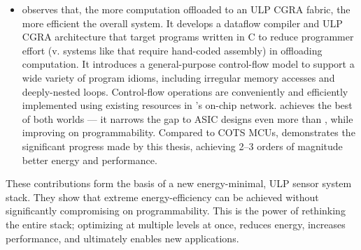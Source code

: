 \begin{itemize}
\item \riptide observes that, the more computation offloaded to an ULP CGRA fabric, the more efficient the overall system.
%
It develops a dataflow compiler and ULP CGRA architecture that target programs written in C to reduce programmer effort (v. systems like \snafu that require hand-coded assembly) in offloading computation.
% 
It introduces a general-purpose control-flow model to support a wide variety of program idioms, including irregular memory accesses and deeply-nested loops.
%
Control-flow operations are conveniently and efficiently implemented using existing resources in \riptide's on-chip network.
% 
% 
% 
\riptide achieves the best of both worlds --- it narrows the gap to ASIC designs even more than \snafu, while improving on programmability.
% 
Compared to COTS MCUs, \riptide demonstrates the significant progress made by this thesis, achieving 2--3 orders of magnitude better energy and performance.

\end{itemize}

These contributions form the basis of a new energy-minimal, ULP sensor system stack.
% 
They show that extreme energy-efficiency can be achieved without significantly compromising on programmability.
%
This is the power of rethinking the entire stack; optimizing at multiple levels at once, reduces energy, increases performance, and ultimately enables new applications.